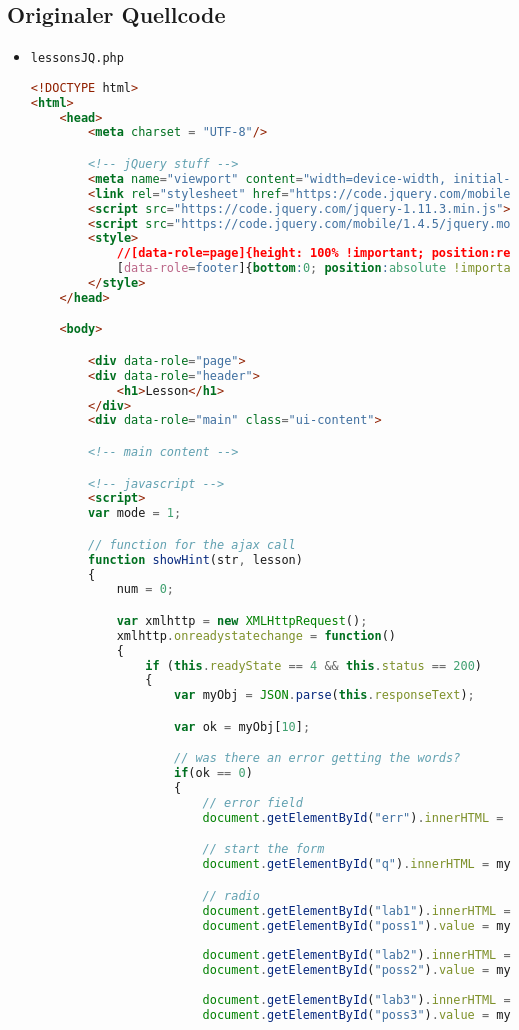 \documentclass{scrartcl}
\begin{document}
\subsection{Originaler Quellcode}
\label{origquell}
\begin{itemize}
\item \lstinline`lessonsJQ.php`
\begin{lstlisting}[language=html]
<!DOCTYPE html>
<html>
	<head>
		<meta charset = "UTF-8"/>

		<!-- jQuery stuff -->
		<meta name="viewport" content="width=device-width, initial-scale=1">
		<link rel="stylesheet" href="https://code.jquery.com/mobile/1.4.5/jquery.mobile-1.4.5.min.css">
		<script src="https://code.jquery.com/jquery-1.11.3.min.js"></script>
		<script src="https://code.jquery.com/mobile/1.4.5/jquery.mobile-1.4.5.min.js"></script>
		<style>
			//[data-role=page]{height: 100% !important; position:relative !important;}
			[data-role=footer]{bottom:0; position:absolute !important; top: auto !important; width:100%;}
		</style>
	</head>

	<body>	

		<div data-role="page">
		<div data-role="header">
			<h1>Lesson</h1>
		</div>
		<div data-role="main" class="ui-content">

		<!-- main content -->

		<!-- javascript -->
		<script>
		var mode = 1;

		// function for the ajax call
		function showHint(str, lesson) 
		{
			num = 0;

			var xmlhttp = new XMLHttpRequest();
			xmlhttp.onreadystatechange = function()
			{
				if (this.readyState == 4 && this.status == 200)
				{
					var myObj = JSON.parse(this.responseText);

					var ok = myObj[10];

					// was there an error getting the words?
					if(ok == 0)
					{
						// error field
						document.getElementById("err").innerHTML = "";		

						// start the form
						document.getElementById("q").innerHTML = myObj[0];

						// radio
						document.getElementById("lab1").innerHTML = myObj[1];
						document.getElementById("poss1").value = myObj[1];
	
						document.getElementById("lab2").innerHTML = myObj[2];
						document.getElementById("poss2").value = myObj[2];
	
						document.getElementById("lab3").innerHTML = myObj[3];
						document.getElementById("poss3").value = myObj[3];
	

\end{lstlisting}
\end{itemize}
\end{document}
